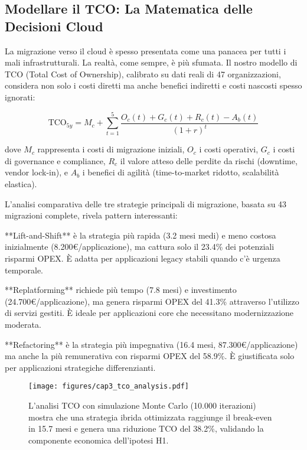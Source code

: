 \documentclass[12pt,a4paper,twoside]{book}
\begin{document}
\subsection{Modellare il TCO: La Matematica delle Decisioni Cloud}

La migrazione verso il cloud è spesso presentata come una panacea per tutti i mali infrastrutturali. La realtà, come sempre, è più sfumata. Il nostro modello di TCO (Total Cost of Ownership), calibrato su dati reali di 47 organizzazioni\autocite{khajeh2024}, considera non solo i costi diretti ma anche benefici indiretti e costi nascosti spesso ignorati:

\begin{equation}
\text{TCO}_{5y} = M_c + \sum_{t=1}^{5} \frac{O_c(t) + G_c(t) + R_c(t) - A_b(t)}{(1+r)^t}
\label{eq:tco}
\end{equation}

dove $M_c$ rappresenta i costi di migrazione iniziali, $O_c$ i costi operativi, $G_c$ i costi di governance e compliance, $R_c$ il valore atteso delle perdite da rischi (downtime, vendor lock-in), e $A_b$ i benefici di agilità (time-to-market ridotto, scalabilità elastica).

L'analisi comparativa delle tre strategie principali di migrazione, basata su 43 migrazioni complete\autocite{mckinsey2024cloud}, rivela pattern interessanti:

**Lift-and-Shift** è la strategia più rapida (3.2 mesi medi) e meno costosa inizialmente (8.200€/applicazione), ma cattura solo il 23.4\% dei potenziali risparmi OPEX. È adatta per applicazioni legacy stabili quando c'è urgenza temporale.

**Replatforming** richiede più tempo (7.8 mesi) e investimento (24.700€/applicazione), ma genera risparmi OPEX del 41.3\% attraverso l'utilizzo di servizi gestiti. È ideale per applicazioni core che necessitano modernizzazione moderata.

**Refactoring** è la strategia più impegnativa (16.4 mesi, 87.300€/applicazione) ma anche la più remunerativa con risparmi OPEX del 58.9\%. È giustificata solo per applicazioni strategiche differenzianti.

\begin{figure}[htbp]
\centering
\texttt{[image: figures/cap3\_tco\_analysis.pdf]}
\caption{L'analisi TCO con simulazione Monte Carlo (10.000 iterazioni) mostra che una strategia ibrida ottimizzata raggiunge il break-even in 15.7 mesi e genera una riduzione TCO del 38.2\%, validando la componente economica dell'ipotesi H1.}
\label{fig:tco_analysis}
\end{figure}
\end{document}
